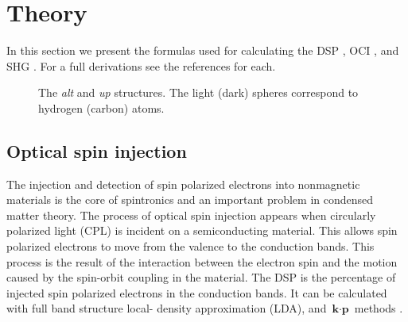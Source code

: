 \documentclass[pss]{wiley2sp} %
\begin{document}
\section{Theory}\label{sec:theory}

In this section we present the formulas used for calculating the DSP \cite{nastos2007full,mendoza2012optical}, OCI \cite{cabellos2011optical,sipe2000second}, and SHG \cite{andersonPRB15}. For a full derivations see the references for each.

\begin{figure}[t]
\hfill
{}
\caption{The \emph{alt} and \emph{up} structures. The light
(dark) spheres correspond to hydrogen (carbon) atoms.\label{fig:structures}}
\end{figure}

\subsection{Optical spin injection}\label{sec:theory-DSP}

The injection and detection of spin polarized electrons into nonmagnetic
materials is the core of spintronics \cite{vzutic2004spintronics,%
fert2008nobel,pezzoli2012optical,bottegoni2013experimental,%
bottegoni2013photoinduced} and an important problem in condensed matter
theory. The process of optical spin injection appears when circularly
polarized light (CPL) \cite{dyakonov1984theory} is incident on a
semiconducting material. This allows spin polarized electrons to move from the
valence to the conduction bands. This process is the result of the interaction
between the electron spin and the motion caused by the spin-orbit coupling in
the material. The DSP is the percentage of injected spin polarized electrons
in the conduction bands. It can be calculated with full band structure local-
density approximation (LDA), and $\textbf{k}\cdot\textbf{p}$ methods
\cite{nastos2007full,cabellos2009stress}.
\end{document}
